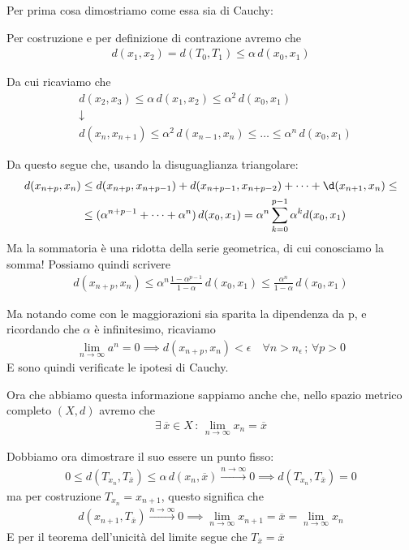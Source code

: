 Per prima cosa dimostriamo come essa sia di Cauchy:

Per costruzione e per definizione di contrazione avremo che
\begin{align}
d(x_1,x_2)= d(T_0,T_1)\leq \alpha \, d(x_0,x_1)
\end{align}

Da cui ricaviamo che 
\begin{align}
{}&d(x_2,x_3) \leq \alpha \, d(x_1,x_2) \leq \alpha^2 \, d(x_0,x_1) \nonumber \\
&\downarrow \nonumber \\
&d(x_n,x_{n+1}) \leq \alpha^2 \, d(x_{n-1},x_n) \leq \dots \leq \alpha^n \, d(x_0,x_1)
\end{align}

Da questo segue che, usando la disuguaglianza triangolare:
\begin{align}
d(x_{n+p}, x_n) {}&\leq d(x_{n+p}, x_{n+p-1}) + d(x_{n+p-1}, x_{n+p-2})  + \dots + \d(x_{n+1}, x_{n}) \leq \nonumber \\
& \leq (\alpha^{n+p-1} + \dots + \alpha^{n}) \, d(x_0,x_1)= \alpha^n \sum_{k=0}^{p-1}\alpha^k d(x_0,x_1) 
\end{align}
Ma la sommatoria è una ridotta della serie geometrica, di cui conosciamo la somma! Possiamo quindi scrivere
\begin{align}
d(x_{n+p}, x_n)  \leq  \alpha^n \frac{1-\alpha^{p-1}}{1-\alpha} \, d(x_0,x_1) \leq \frac{\alpha^n}{1-\alpha} \, d(x_0,x_1)
\end{align}

Ma notando come con le maggiorazioni sia sparita la dipendenza da p, e ricordando che $\alpha$ è infinitesimo, ricaviamo
\begin{align}
\underset{n\rightarrow \infty}{\lim}a^n=0 \implies d(x_{n+p}, x_n) < \epsilon \quad \forall n>n_\epsilon \, ; \, \forall p>0
\end{align}
E sono quindi verificate le ipotesi di Cauchy.

Ora che abbiamo questa informazione sappiamo anche che, nello spazio metrico completo $(X,d)$ avremo che 
\begin{align}
\exists \, \overline{x} \in X \, : \, \underset{n\rightarrow \infty}{\lim}x_n= \overline{x}
\end{align}

Dobbiamo ora dimostrare il suo essere un punto fisso:
\begin{align}
0 \leq d(T_{x_n}, T_{\overline{x}}) \leq \alpha \, d(x_n, \overline{x})\overset{n\rightarrow \infty}{\longrightarrow}0 \implies d(T_{x_n}, T_{\overline{x}}) =0
\end{align} 
ma per costruzione $T_{x_n}=x_{n+1}$, questo significa che
\begin{align}
 d(x_{n+1}, T_{\overline{x}})\overset{n\rightarrow \infty}{\longrightarrow}0 \implies \underset{n\rightarrow \infty}{\lim}x_{n+1}= \overline{x} = \underset{n\rightarrow \infty}{\lim}x_n
\end{align}
E per il teorema dell'unicità del limite segue che $T_{\overline{x}}=\overline{x}$

